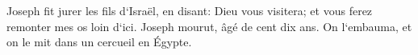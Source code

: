 \verse Joseph fit jurer les fils d`Israël, en disant: Dieu vous visitera; et vous ferez remonter mes os loin d`ici. 
\verse Joseph mourut, âgé de cent dix ans. On l`embauma, et on le mit dans un cercueil en Égypte. 

